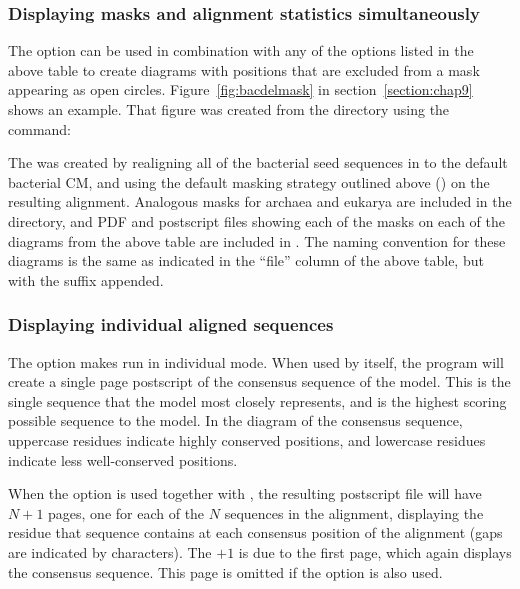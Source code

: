 \subsubsection{Displaying masks and alignment statistics simultaneously}

The  option can be used in combination with any of the
options listed in the above table to create diagrams 
with positions that are excluded from a mask appearing as open
circles. Figure~\ref{fig:bacdelmask} in section~\ref{section:chap9}
shows an example. That figure was created from the
 directory using the command:


The  was created by realigning all
of the bacterial seed sequences in
 to the default bacterial
CM, and using the default masking strategy outlined above 
()
on the resulting alignment. Analogous masks for archaea and eukarya
are included in the  directory, and PDF and
postscript files showing each of the masks on each of the diagrams
from the above table are included in 
. The naming convention for
these diagrams is the same as indicated in the ``file'' column of the
above table, but with the suffix  appended.

\subsubsection{Displaying individual aligned sequences}

The  option makes  run in individual
mode. When used by itself, the program will create a single page
postscript of the consensus sequence of the model. This is the
single sequence that the model most closely represents, and is the
highest scoring possible sequence to the model. In the diagram of the
consensus sequence, uppercase residues indicate highly conserved positions,
and lowercase residues indicate less well-conserved positions.

When the  option is used together with , the
resulting postscript file will have $N+1$ pages, one for each of the
$N$ sequences in the alignment, displaying the residue that sequence
contains at each consensus position of the alignment (gaps are
indicated by \prog{-} characters). The $+1$ is due to the first page,
which again displays the consensus sequence. This page is omitted if
the  option is also used.

